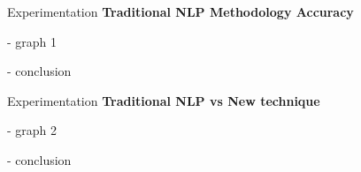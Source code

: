 \begin{frame}[label=exp]{Experimentation}
	\textbf{Traditional NLP Methodology Accuracy}
	
	-	graph 1
	
	-	conclusion
	
\end{frame}




\begin{frame}[label=exp]{Experimentation}
	\textbf{Traditional NLP vs New technique}
	
	-	graph 2
	
	-	conclusion
	
\end{frame}



